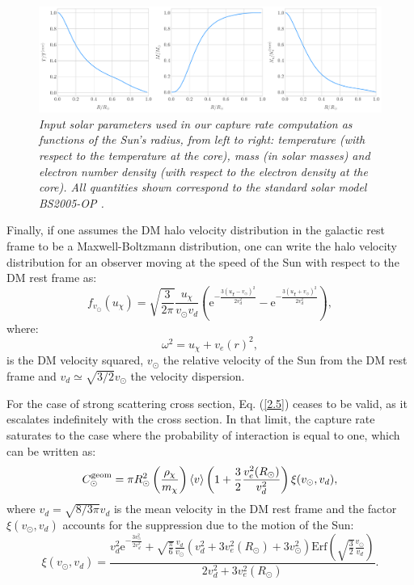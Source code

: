 \begin{figure}[t]
	\centering
	\includegraphics[width=1\linewidth]{Images/DM_Analysis/ssm_params.pdf}
	\caption{\textit{Input solar parameters used in our capture rate computation as functions of the Sun's radius, from left to right: temperature (with respect to the temperature at the core), mass (in solar masses) and electron number density (with respect to the electron density at the core). All quantities shown correspond to the standard solar model BS2005-OP \cite{Bahcall2004}.}}
	\label{fig:ssm_params}
\end{figure}

Finally, if one assumes the DM halo velocity distribution in the galactic rest frame to be a Maxwell-Boltzmann distribution, one can write the halo velocity distribution for an observer moving at the speed of the Sun with respect to the DM rest frame as:
\begin{equation}\label{2.12}
	f_{v_{\odot}}(u_{\chi}) = \sqrt{\frac{3}{2\pi}} \frac{u_{\chi}}{v_{\odot} v_{d}} \left(\mathrm{e}^{-\frac{3(u_{\chi}-v_{\odot})^{2}}{2v_{d}^{2}}}-\mathrm{e}^{-\frac{3(u_{\chi}+v_{\odot})^{2}}{2v_{d}^{2}}}\right),
\end{equation}
where:
\begin{equation}\label{2.13}
	\omega^{2} = u_{\chi} + v_{e}(r)^{2},
\end{equation}
is the DM velocity squared, $v_{\odot}$ the relative velocity of the Sun from the DM rest frame and $v_{d} \simeq \sqrt{3/2} v_{\odot}$ the velocity dispersion.

For the case of strong scattering cross section, Eq. (\ref{2.5}) ceases to be valid, as it escalates indefinitely with the cross section. In that limit, the capture rate saturates to the case where the probability of interaction is equal to one, which can be written as:
\begin{equation}\label{2.14}
	C_{\odot}^{\mathrm{geom}} = \pi R_{\odot}^{2} \left(\frac{\rho_{\chi}}{m_{\chi}}\right) \expval{v} \left(1+\frac{3}{2}\frac{v_{e}^{2}(R_{\odot})}{v_{d}^{2}}\right) \xi(v_{\odot}, v_{d}),
\end{equation}
where $v_{d} = \sqrt{8/3\pi} v_{d}$ is the mean velocity in the DM rest frame and the factor $\xi(v_{\odot}, v_{d})$ accounts for the suppression due to the motion of the Sun:
\begin{equation}\label{2.15}
	\xi(v_{\odot}, v_{d}) = \frac{v_{d}^{2}\mathrm{e}^{-\frac{3v_{\odot}^{2}}{2v_{d}^{2}}}+\sqrt{\frac{\pi}{6}}\frac{v_{d}}{v_{\odot}}\left(v_{d}^{2}+3v_{e}^{2}(R_{\odot})+3v_{\odot}^{2}\right)\mathrm{Erf}\left(\sqrt{\frac{3}{2}}\frac{v_{\odot}}{v_{d}}\right)}{2v_{d}^{2}+3v_{e}^{2}(R_{\odot})}.
\end{equation}

